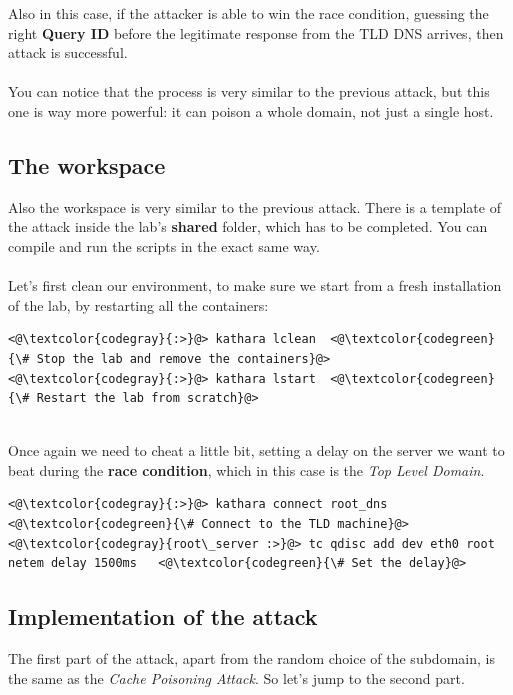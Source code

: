 \documentclass[11pt,a4paper]{article}
\begin{document}
\noindent
Also in this case, if the attacker is able to win the race condition, guessing the right
\textbf{Query ID} before the legitimate response from the TLD DNS arrives, then attack
is successful.
\\
\\
\noindent
You can notice that the process is very similar to the previous attack, but this one
is way more powerful: it can poison a whole domain, not just a single host.

\subsection{The workspace}

Also the workspace is very similar to the previous attack. There is a template of the
attack inside the lab's \textbf{shared} folder, which has to be completed. You can
compile and run the scripts in the exact same way.
\\
\\
\noindent
Let's first clean our environment, to make sure we start from a fresh installation of
the lab, by restarting all the containers:

\begin{lstlisting}
<@\textcolor{codegray}{:>}@> kathara lclean  <@\textcolor{codegreen}{\# Stop the lab and remove the containers}@>
<@\textcolor{codegray}{:>}@> kathara lstart  <@\textcolor{codegreen}{\# Restart the lab from scratch}@>
\end{lstlisting}

\noindent
\\
Once again we need to cheat a little bit, setting a delay on the server we want to beat
during the \textbf{race condition}, which in this case is the \emph{Top Level Domain}.

\begin{lstlisting}
<@\textcolor{codegray}{:>}@> kathara connect root_dns                       <@\textcolor{codegreen}{\# Connect to the TLD machine}@>
<@\textcolor{codegray}{root\_server :>}@> tc qdisc add dev eth0 root netem delay 1500ms   <@\textcolor{codegreen}{\# Set the delay}@>
\end{lstlisting}

\subsection{Implementation of the attack}

The first part of the attack, apart from the random choice of the subdomain, is the same
as the \emph{Cache Poisoning Attack}. So let's jump to the second part.
\end{document}
